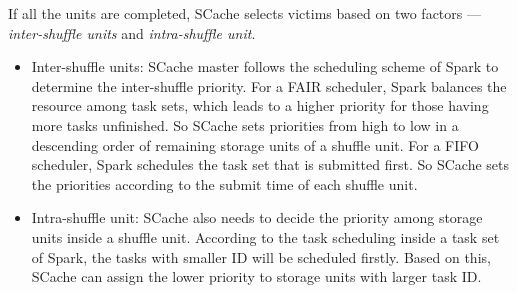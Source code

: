 If all the units are completed, SCache selects victims based on two factors --- \textit{inter-shuffle units} and \textit{intra-shuffle unit}.
\begin{itemize}[noitemsep]
	\item Inter-shuffle units: SCache master follows the scheduling scheme of Spark to determine the inter-shuffle priority. For a FAIR scheduler, Spark balances the resource among task sets, which leads to a higher priority for those having more tasks unfinished. So SCache sets priorities from high to low in a descending order of remaining storage units of a shuffle unit. For a FIFO scheduler, Spark schedules the task set that is submitted first. So SCache sets the priorities according to the submit time of each shuffle unit.
	\item Intra-shuffle unit: SCache also needs to decide the priority among storage units inside a shuffle unit. According to the task scheduling inside a task set of Spark, the tasks with smaller ID will be scheduled firstly. Based on this, SCache can assign the lower priority to storage units with larger task ID.
\end{itemize}






